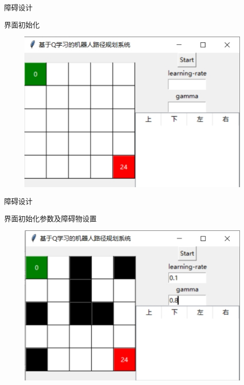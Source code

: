\documentclass{beamer}
\begin{document}
\begin{frame}{障碍设计}
    \item 界面初始化
    \begin{minipage}{1\linewidth}
        \medskip
        \begin{figure}[h]
            \centering
            \includegraphics[height=.8\textheight]{pic/19.jpg}
        \end{figure}
    \end{minipage}
\end{frame}

\begin{frame}{障碍设计}
    \item 界面初始化参数及障碍物设置
    \begin{minipage}{1\linewidth}
        \medskip
        \begin{figure}[h]
            \centering
            \includegraphics[height=.8\textheight]{pic/20.jpg}
        \end{figure}
    \end{minipage}
\end{frame}
\end{document}
